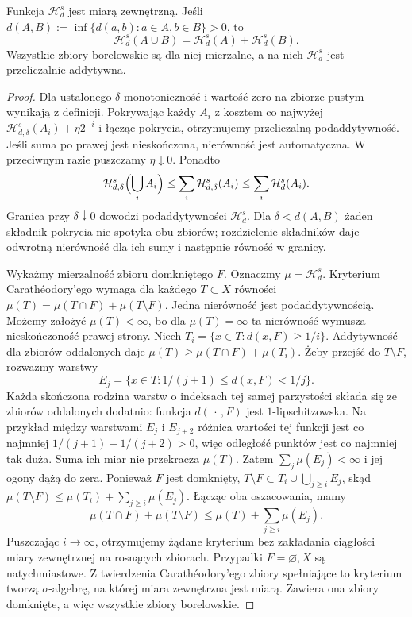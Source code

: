 \begin{stwierdzenie}
\label{prop:hausdorff-borel}
Funkcja $\mathcal H^s_d$ jest miarą zewnętrzną.
Jeśli $d(A,B):=\inf\{d(a,b):a\in A,b\in B\}>0$, to
\[
 \mathcal H^s_d(A\cup B)=\mathcal H^s_d(A)+\mathcal H^s_d(B).
\]
Wszystkie zbiory borelowskie są dla niej mierzalne,
a na nich $\mathcal H^s_d$ jest przeliczalnie addytywna.
\end{stwierdzenie}
\begin{proof}
Dla ustalonego $\delta$ monotoniczność i wartość zero
na zbiorze pustym wynikają z definicji. Pokrywając
każdy $A_i$ z kosztem co najwyżej
$\mathcal H^s_{d,\delta}(A_i)+\eta2^{-i}$ i łącząc
pokrycia, otrzymujemy przeliczalną podaddytywność.
Jeśli suma po prawej jest nieskończona, nierówność
jest automatyczna. W przeciwnym razie puszczamy
$\eta\downarrow0$. Ponadto
\[
 \mathcal H^s_{d,\delta}\Bigl(\bigcup_i A_i\Bigr)
 \leq\sum_i\mathcal H^s_{d,\delta}(A_i)
 \leq\sum_i\mathcal H^s_d(A_i).
\]
Granica przy $\delta\downarrow0$ dowodzi
podaddytywności $\mathcal H^s_d$. Dla
$\delta<d(A,B)$ żaden składnik pokrycia nie spotyka
obu zbiorów; rozdzielenie składników daje odwrotną
nierówność dla ich sumy i następnie równość w granicy.

Wykażmy mierzalność zbioru domkniętego $F$.
Oznaczmy $\mu=\mathcal H^s_d$. Kryterium Carathéodory'ego
wymaga dla każdego $T\subset X$ równości
$\mu(T)=\mu(T\cap F)+\mu(T\setminus F)$.
Jedna nierówność jest podaddytywnością. Możemy założyć
$\mu(T)<\infty$, bo dla $\mu(T)=\infty$ ta nierówność
wymusza nieskończoność prawej strony.
Niech $T_i=\{x\in T:d(x,F)\geq1/i\}$.
Addytywność dla zbiorów oddalonych daje
$\mu(T)\geq\mu(T\cap F)+\mu(T_i)$.
Żeby przejść do $T\setminus F$, rozważmy warstwy
\[
 E_j=\{x\in T:1/(j+1)\leq d(x,F)<1/j\}.
\]
Każda skończona rodzina warstw o indeksach tej samej
parzystości składa się ze zbiorów oddalonych dodatnio:
funkcja $d(\,\cdot\,,F)$ jest $1$-lipschitzowska.
Na przykład między warstwami $E_j$ i $E_{j+2}$
różnica wartości tej funkcji jest co najmniej
$1/(j+1)-1/(j+2)>0$, więc odległość punktów
jest co najmniej tak duża.
Suma ich miar nie przekracza $\mu(T)$.
Zatem $\sum_j\mu(E_j)<\infty$ i jej ogony dążą do zera.
Ponieważ $F$ jest domknięty,
$T\setminus F\subset T_i\cup\bigcup_{j\geq i}E_j$,
skąd $\mu(T\setminus F)\leq\mu(T_i)+\sum_{j\geq i}\mu(E_j)$.
Łącząc oba oszacowania, mamy
\[
 \mu(T\cap F)+\mu(T\setminus F)
 \leq\mu(T)+\sum_{j\geq i}\mu(E_j).
\]
Puszczając $i\to\infty$, otrzymujemy żądane kryterium
bez zakładania ciągłości miary zewnętrznej na rosnących zbiorach.
Przypadki $F=\varnothing,X$ są natychmiastowe.
Z twierdzenia Carathéodory'ego zbiory spełniające to
kryterium tworzą $\sigma$-algebrę, na której miara
zewnętrzna jest miarą. Zawiera ona zbiory domknięte,
a więc wszystkie zbiory borelowskie.
\end{proof}

